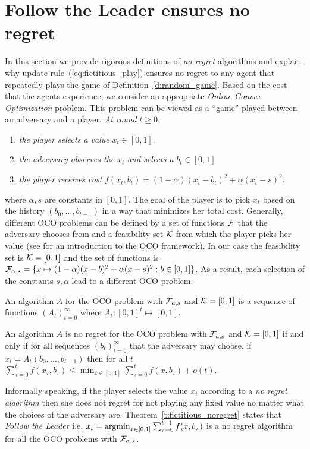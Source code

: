 \section{Follow the Leader ensures no regret}\label{s:fictitious_noregret}

In this section we provide rigorous definitions of \emph{no regret} algorithms
and explain why update rule~(\ref{eq:fictitious_play}) ensures
no regret to any agent that repeatedly plays the game of
Definition~\ref{d:random_game}.
Based on the cost that the agents experience,
we consider an appropriate \emph{Online Convex Optimization} problem.
This problem can be viewed as a \enquote{game} played between an
adversary and a player. \emph{At round }$t\geq 0$,
\begin{enumerate}
  \item \emph{the player selects a value }$x_t \in [0,1]$.
  \item \emph{the adversary observes the }$x_t$ \emph{and selects a} $b_t \in [0,1]$
  \item \emph{the player receives cost} $f(x_t,b_t)=(1-\alpha)(x_t-b_t)^2 + \alpha(x_t -s)^2$.
\end{enumerate}
where $\alpha,s$ are constants in $[0,1]$. The goal of
the player is to pick $x_t$ based on the history
$(b_0,\ldots,b_{t-1})$ in a way that minimizes her total cost.
Generally, different OCO problems can be defined by a set of functions
$\mathcal{F}$ that the adversary chooses from and a feasibility
set $\mathcal{K}$ from which the player picks her value (see \cite{Haz16}
for an introduction to the OCO framework).
In our case the feasibility set is $\mathcal{K}=[0,1]$ and the set of functions
is
$\mathcal{F}_{\alpha,s} = \{x \mapsto (1-\alpha)(x-b)^2 + \alpha(x -s)^2 : b \in [0,1]\}$.
As a result, each selection of the
constants $s,\alpha$ lead to a different OCO problem.

\begin{definition}\label{d:OCO_algo}
An algorithm $A$ for the OCO problem with $\mathcal{F}_{a,s}$ and
$\mathcal{K}=[0,1]$ is a sequence of functions $(A_t)_{t=0}^\infty$ where $A_t:[0,1]^t \mapsto [0,1]$.
\end{definition}

\begin{definition}\label{d:no_regret_algo}
An algorithm $A$ is no regret for the OCO problem with $\mathcal{F}_{a,s}$ and
$\mathcal{K}=[0,1]$ if and only if for all sequences $(b_t)_{t=0}^\infty$ that the
adversary may choose, if $x_t = A_t(b_0,\dots,b_{t-1})$ then for all $t$
\(\sum_{\tau=0}^t f(x_\tau,b_\tau)  \leq \min_{x \in [0,1]}\sum_{\tau=0}^t f(x,b_\tau) + o(t).\)
\end{definition}
Informally speaking, if the player selects the value
$x_t$ according to a \emph{no regret algorithm} then
she does not regret for not playing any fixed value no
matter what the choices of the adversary are.
Theorem~\ref{t:fictitious_noregret} states that
\emph{Follow the Leader} i.e. $x_t = \operatorname*{argmin}_{x \in [0,1]}\sum_{\tau=0}^{t-1}f(x,b_\tau)$
is a no regret algorithm for all the OCO problems with $\mathcal{F}_{\alpha,s}$.

